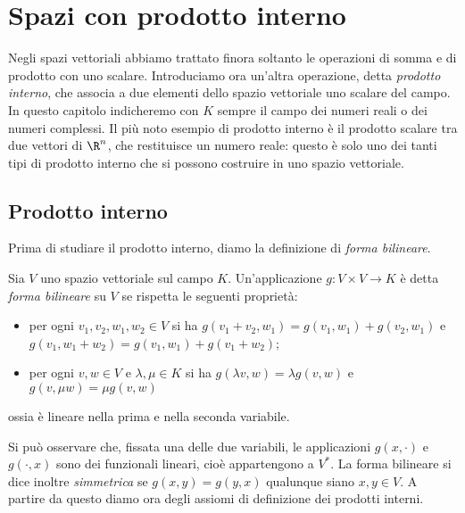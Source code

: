 \chapter{Spazi con prodotto interno} \label{ch:spazi-prodotto-interno}
Negli spazi vettoriali abbiamo trattato finora soltanto le operazioni di somma e di prodotto con uno scalare.
Introduciamo ora un'altra operazione, detta \emph{prodotto interno}, che associa a due elementi dello spazio vettoriale uno scalare del campo.
In questo capitolo indicheremo con $K$ sempre il campo dei numeri reali o dei numeri complessi.
Il più noto esempio di prodotto interno è il prodotto scalare tra due vettori di $\R^n$, che restituisce un numero reale: questo è solo uno dei tanti tipi di prodotto interno che si possono costruire in uno spazio vettoriale.

\section{Prodotto interno} \label{sec:prodotto-interno}
Prima di studiare il prodotto interno, diamo la definizione di \emph{forma bilineare}.
\begin{definizione} \label{d:forma-bilineare}
	Sia $V$ uno spazio vettoriale sul campo $K$.
	Un'applicazione $g\colon V\times V\to K$ è detta \emph{forma bilineare} su $V$ se rispetta le seguenti proprietà:
	\begin{itemize}
		\item per ogni $  v_1,  v_2,  w_1,  w_2\in V$ si ha $g(  v_1+  v_2,  w_1)=g(  v_1,  w_1)+g(  v_2,  w_1)$ e $g(  v_1,  w_1+  w_2)=g(  v_1,  w_1)+g(  v_1+  w_2)$;
		\item per ogni $  v,  w\in V$ e $\lambda,\mu\in K$ si ha $g(\lambda  v,  w)=\lambda g(  v,  w)$ e $g(  v,\mu  w)=\mu g(  v,  w)$
	\end{itemize}
	ossia è lineare nella prima e nella seconda variabile.
\end{definizione}
Si può osservare che, fissata una delle due variabili, le applicazioni $g(  x,\cdot)$ e $g(\cdot,  x)$ sono dei funzionali lineari, cioè appartengono a $V^*$.
La forma bilineare si dice inoltre \emph{simmetrica} se $g(  x,  y)=g(  y,  x)$ qualunque siano $  x,  y\in V$.
A partire da questo diamo ora degli assiomi di definizione dei prodotti interni.

